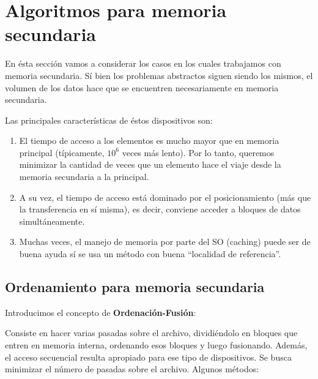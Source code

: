 \newpage
\section{Algoritmos para memoria secundaria}

En \'esta secci\'on vamos a considerar los casos en los cuales trabajamos con memoria secundaria. S\'i bien los problemas abstractos siguen siendo los mismos, el volumen de los datos hace que se encuentren necesariamente en memoria secundaria. 

Las principales caracter\'isticas de \'estos dispositivos son:
 \begin{enumerate}
  \item El tiempo de acceso a los elementos es mucho mayor que en memoria principal (t\'ipicamente, $10^6$ veces m\'as lento). Por lo tanto, queremos minimizar la cantidad de veces que un elemento hace el viaje desde la memoria secundaria a la principal.
  \item A su vez, el tiempo de acceso est\'a dominado por el posicionamiento (m\'as que la transferencia en s\'i misma), es decir, conviene acceder a bloques de datos simult\'aneamente.
  \item Muchas veces, el manejo de memoria por parte del SO (caching) puede ser de buena ayuda s\'i se usa un m\'etodo con buena ``localidad de referencia''.
 \end{enumerate}

\subsection{Ordenamiento para memoria secundaria}

Introducimos el concepto de \textbf{Ordenaci\'on-Fusi\'on}:

Consiste en hacer varias pasadas sobre el archivo, dividi\'endolo en bloques que entren en memoria interna, ordenando esos bloques y luego fusionando. Adem\'as, el acceso secuencial resulta apropiado para ese tipo de dispositivos. Se busca minimizar el n\'umero de pasadas sobre el archivo.
Algunos m\'etodos:

~

